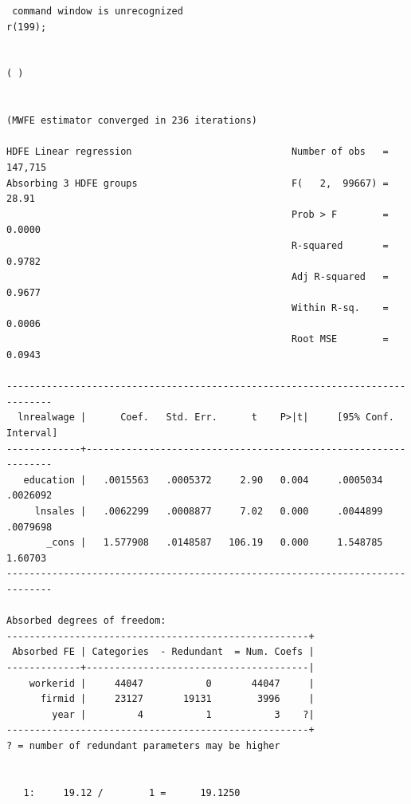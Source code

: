 \documentclass[
  12pt,
]{article}
\newenvironment{Shaded}{\begin{snugshade}}{\end{snugshade}}
\newcommand{\KeywordTok}[1]{\textcolor[rgb]{0.13,0.29,0.53}{\textbf{#1}}}
\newcommand{\NormalTok}[1]{#1}
\newcommand{\OperatorTok}[1]{\textcolor[rgb]{0.81,0.36,0.00}{\textbf{#1}}}
\newcommand{\StringTok}[1]{\textcolor[rgb]{0.31,0.60,0.02}{#1}}
\begin{document}
\begin{verbatim}
 command window is unrecognized
r(199);


( )


(MWFE estimator converged in 236 iterations)

HDFE Linear regression                            Number of obs   =    147,715
Absorbing 3 HDFE groups                           F(   2,  99667) =      28.91
                                                  Prob > F        =     0.0000
                                                  R-squared       =     0.9782
                                                  Adj R-squared   =     0.9677
                                                  Within R-sq.    =     0.0006
                                                  Root MSE        =     0.0943

------------------------------------------------------------------------------
  lnrealwage |      Coef.   Std. Err.      t    P>|t|     [95% Conf. Interval]
-------------+----------------------------------------------------------------
   education |   .0015563   .0005372     2.90   0.004     .0005034    .0026092
     lnsales |   .0062299   .0008877     7.02   0.000     .0044899    .0079698
       _cons |   1.577908   .0148587   106.19   0.000     1.548785     1.60703
------------------------------------------------------------------------------

Absorbed degrees of freedom:
-----------------------------------------------------+
 Absorbed FE | Categories  - Redundant  = Num. Coefs |
-------------+---------------------------------------|
    workerid |     44047           0       44047     |
      firmid |     23127       19131        3996     |
        year |         4           1           3    ?|
-----------------------------------------------------+
? = number of redundant parameters may be higher


   1:     19.12 /        1 =      19.1250
\end{verbatim}

\begin{Shaded}
\end{Shaded}
\end{document}
